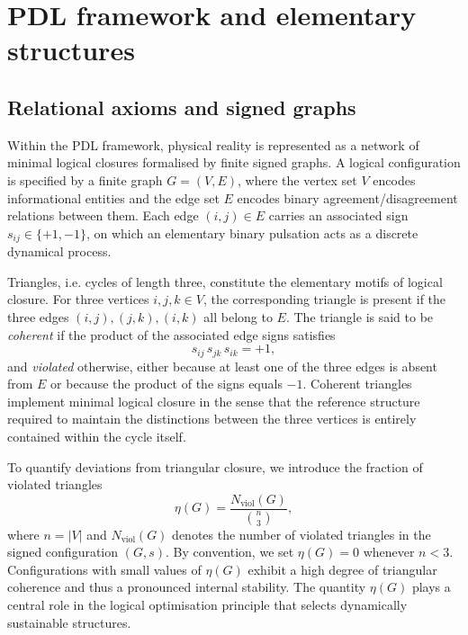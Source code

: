 \documentclass[12pt,a4paper]{article}
\begin{document}
\section{PDL framework and elementary structures}

\subsection{Relational axioms and signed graphs}

Within the PDL framework, physical reality is represented as a network of minimal logical closures formalised by finite signed graphs.\cite{Laubscher2026IntroPDL,Laubscher2026PDL_English,Laubscher2026LDP_French} A logical configuration is specified by a finite graph \(G = (V,E)\), where the vertex set \(V\) encodes informational entities and the edge set \(E\) encodes binary agreement/disagreement relations between them. Each edge \((i,j)\in E\) carries an associated sign \(s_{ij}\in\{+1,-1\}\), on which an elementary binary pulsation acts as a discrete dynamical process.

Triangles, i.e. cycles of length three, constitute the elementary motifs of logical closure. For three vertices \(i,j,k\in V\), the corresponding triangle is present if the three edges \((i,j),(j,k),(i,k)\) all belong to \(E\). The triangle is said to be \emph{coherent} if the product of the associated edge signs satisfies
\[
  s_{ij}\,s_{jk}\,s_{ik} = +1,
\]
and \emph{violated} otherwise, either because at least one of the three edges is absent from \(E\) or because the product of the signs equals \(-1\). Coherent triangles implement minimal logical closure in the sense that the reference structure required to maintain the distinctions between the three vertices is entirely contained within the cycle itself.\cite{Laubscher2026IntroPDL,Laubscher2026PDL_English}

To quantify deviations from triangular closure, we introduce the fraction of violated triangles
\[
  \eta(G)
  =
  \frac{N_{\text{viol}}(G)}{\binom{n}{3}},
\]
where \(n = |V|\) and \(N_{\text{viol}}(G)\) denotes the number of violated triangles in the signed configuration \((G,s)\). By convention, we set \(\eta(G)=0\) whenever \(n<3\). Configurations with small values of \(\eta(G)\) exhibit a high degree of triangular coherence and thus a pronounced internal stability. The quantity \(\eta(G)\) plays a central role in the logical optimisation principle that selects dynamically sustainable structures.\cite{Laubscher2026IntroPDL,Laubscher2026PDL_English}
\end{document}

